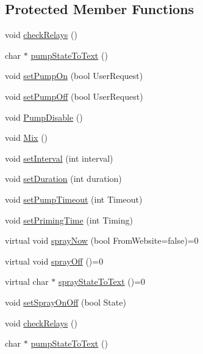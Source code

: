 \subsection*{Protected Member Functions}
\begin{DoxyCompactItemize}
\item 
void \hyperlink{class_aeroponics_a0f70505e6b8722985f6ab52f17595cdd}{check\+Relays} ()
\item 
char $\ast$ \hyperlink{class_aeroponics_acdb382c7077f71d198ceaf6c4b8ed664}{pump\+State\+To\+Text} ()
\item 
void \hyperlink{class_aeroponics_ae4d0324ae9193294ed4a1ca5ab247537}{set\+Pump\+On} (bool User\+Request)
\item 
void \hyperlink{class_aeroponics_a24561429d2ee5cf75f86edbe6e0a1d80}{set\+Pump\+Off} (bool User\+Request)
\item 
void \hyperlink{class_aeroponics_a235ada2ee2e5ab79542da63e3fc70cb5}{Pump\+Disable} ()
\item 
void \hyperlink{class_aeroponics_a509f52009146d740a519154b5beca6ff}{Mix} ()
\item 
void \hyperlink{class_aeroponics_a769b673b25fad588fd2dc013f5a62132}{set\+Interval} (int interval)
\item 
void \hyperlink{class_aeroponics_a0414c6a5be2ff2da7d88e83cc2364110}{set\+Duration} (int duration)
\item 
void \hyperlink{class_aeroponics_ac0363ff5470e85f5acda1842a616dd41}{set\+Pump\+Timeout} (int Timeout)
\item 
void \hyperlink{class_aeroponics_ad9568506941f5de8d849eae4daca1bd7}{set\+Priming\+Time} (int Timing)
\item 
virtual void \hyperlink{class_aeroponics_aecda76aae20ce45fd9a080770cf07e56}{spray\+Now} (bool From\+Website=false)=0
\item 
virtual void \hyperlink{class_aeroponics_a961b5818322eb6d0268d2f2f4763768e}{spray\+Off} ()=0
\item 
virtual char $\ast$ \hyperlink{class_aeroponics_aa79435aaa49a563d41ae092ec3e87e06}{spray\+State\+To\+Text} ()=0
\item 
void \hyperlink{class_aeroponics_a459d83fc32d3369938be2953138c9b96}{set\+Spray\+On\+Off} (bool State)
\item 
void \hyperlink{class_aeroponics_a0f70505e6b8722985f6ab52f17595cdd}{check\+Relays} ()
\item 
char $\ast$ \hyperlink{class_aeroponics_ae20bf74b4eaa0651f1253dafab201b3b}{pump\+State\+To\+Text} ()
\item 

\end{DoxyCompactItemize}
